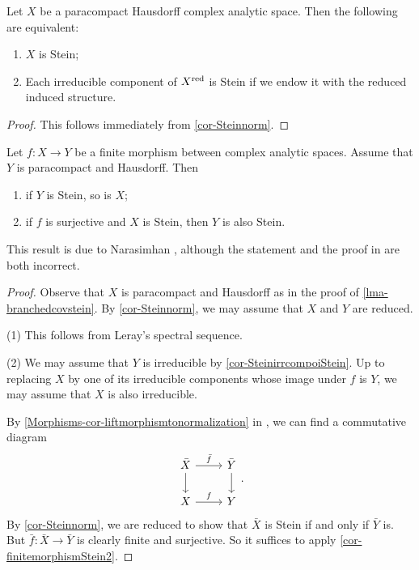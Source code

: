 \begin{corollary}\label{cor-SteinirrcompoiStein}
    Let $X$ be a paracompact Hausdorff complex analytic space. Then the following are equivalent:
    \begin{enumerate}
        \item $X$ is Stein;
        \item Each irreducible component of $X^{\operatorname{red}}$ is Stein if we endow it with the reduced induced structure.
    \end{enumerate}
\end{corollary}
\begin{proof}
    This follows immediately from \cref{cor-Steinnorm}.
\end{proof}

\begin{corollary}
    Let $f:X\rightarrow Y$ be a finite morphism between complex analytic spaces. Assume that $Y$ is paracompact and Hausdorff. Then 
    \begin{enumerate}
        \item if $Y$ is Stein, so is $X$;
        \item if $f$ is surjective and $X$ is Stein, then $Y$ is also Stein.
    \end{enumerate}
\end{corollary}
This result is due to Narasimhan \cite{Nar62}, although the statement and the proof in \cite{Nar62} are both incorrect.
\begin{proof}
    Observe that $X$ is paracompact and Hausdorff as in the proof of \cref{lma-branchedcovstein}. By \cref{cor-Steinnorm}, we may assume that $X$ and $Y$ are reduced.

    (1) This follows from Leray's spectral sequence.

    (2) We may assume that $Y$ is irreducible by \cref{cor-SteinirrcompoiStein}. Up to replacing $X$ by one of its irreducible components whose image under $f$ is $Y$, we may assume that $X$ is also irreducible.
    
    By \cref{Morphisms-cor-liftmorphismtonormalization} in  , we can find a commutative diagram 
    \[
        \begin{tikzcd}
            \bar{X} \arrow[r, "\bar{f}"] \arrow[d] & \bar{Y} \arrow[d] \\
            X \arrow[r, "f"]                       & Y                
        \end{tikzcd}.  
    \]
    By \cref{cor-Steinnorm}, we are reduced to show that $\bar{X}$ is Stein if and only if $\bar{Y}$ is. But $\bar{f}:\bar{X}\rightarrow \bar{Y}$ is clearly finite and surjective. So it suffices to apply \cref{cor-finitemorphismStein2}.
\end{proof}

\printbibliography
